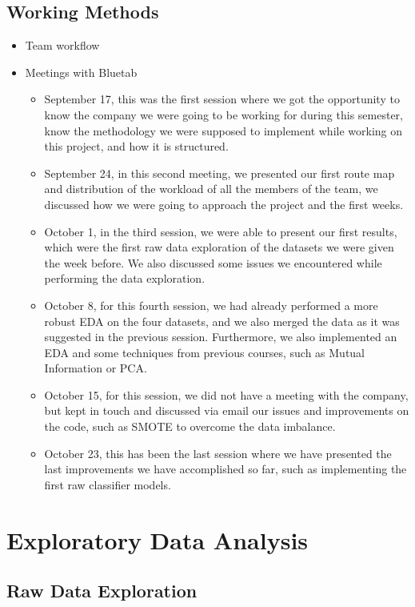 \documentclass[12pt]{report} %
\begin{document}
\section{Working Methods}
\begin{itemize}
\item Team workflow
\item Meetings with Bluetab
    \begin{itemize}
    \item September 17, this was the first session where we got the opportunity to know the company we were going to be working for during this semester, know the methodology we were supposed to implement while working on this project, and how it is structured.
    \item September 24, in this second meeting, we presented our first route map and distribution of the workload of all the members of the team, we discussed how we were going to approach the project and the first weeks.
    \item October 1, in the third session, we were able to present our first results, which were the first raw data exploration of the datasets we were given the week before. We also discussed some issues we encountered while performing the data exploration.
    \item October 8, for this fourth session, we had already performed a more robust EDA on the four datasets, and we also merged the data as it was suggested in the previous session. Furthermore, we also implemented an EDA and some techniques from previous courses, such as Mutual Information or PCA.
    \item October 15, for this session, we did not have a meeting with the company, but kept in touch and discussed via email our issues and improvements on the code, such as SMOTE to overcome the data imbalance.
    \item October 23, this has been the last session where we have presented the last improvements we have accomplished so far, such as implementing the first raw classifier models.
    \end{itemize}

\end{itemize}



\chapter{Exploratory Data Analysis}

\section{Raw Data Exploration}
\end{document}
